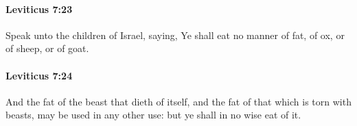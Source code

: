 		\paragraph{Leviticus 7:23} %
			\label{LEVITICUS-7-23}

			Speak unto the children of Israel, saying, Ye shall eat no manner of fat, of ox, or of sheep, or of goat.


		\paragraph{Leviticus 7:24} %
			\label{LEVITICUS-7-24}

			And the fat of the beast that dieth of itself, and the fat of that which is torn with beasts, may be used in any other use: but ye shall in no wise eat of it.


